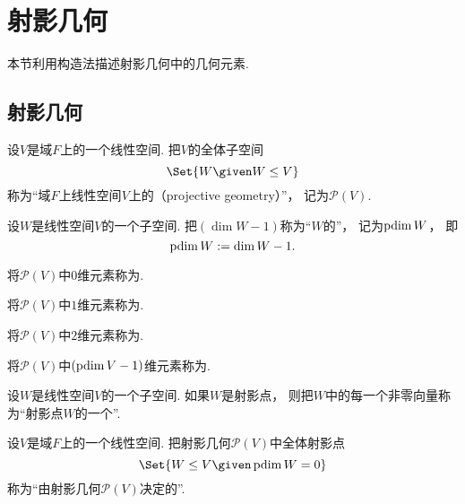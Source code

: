 \section{射影几何}
本节利用构造法描述射影几何中的几何元素.

\subsection{射影几何}
\begin{definition}
设\(V\)是域\(F\)上的一个线性空间.
把\(V\)的全体子空间\begin{equation*}
	\Set{
		W
		\given
		W \AlgebraSubstructure V
	}
\end{equation*}
称为“域\(F\)上线性空间\(V\)上的（projective geometry）”，
记为\(\mathcal{P}(V)\).
\end{definition}

\begin{definition}
设\(W\)是线性空间\(V\)的一个子空间.
把\((\dim W - 1)\)称为“\(W\)的”，
记为\(\operatorname{pdim} W\)，
即\begin{equation*}
	\operatorname{pdim} W := \dim W - 1.
\end{equation*}

将\(\mathcal{P}(V)\)中\(0\)维元素称为.

将\(\mathcal{P}(V)\)中\(1\)维元素称为.

将\(\mathcal{P}(V)\)中\(2\)维元素称为.

将\(\mathcal{P}(V)\)中\((\operatorname{pdim} V-1)\)维元素称为.
\end{definition}

\begin{definition}
设\(W\)是线性空间\(V\)的一个子空间.
如果\(W\)是射影点，
则把\(W\)中的每一个非零向量称为“射影点\(W\)的一个”.
\end{definition}

\begin{definition}
设\(V\)是域\(F\)上的一个线性空间.
把射影几何\(\mathcal{P}(V)\)中全体射影点\begin{equation*}
	\Set{
		W \AlgebraSubstructure V
		\given
		\pdim W = 0
	}
\end{equation*}
称为“由射影几何\(\mathcal{P}(V)\)决定的”.
\end{definition}

